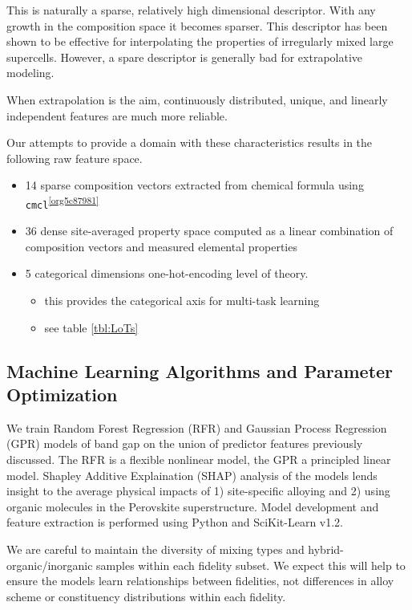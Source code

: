 This is naturally a sparse, relatively high dimensional descriptor.
With any growth in the composition space it becomes sparser.
This descriptor has been shown to be effective for interpolating the properties of irregularly mixed large supercells.
\autocite{mannodi-kanakkithodi-2022-data-driven}
However, a spare descriptor is generally bad for extrapolative modeling.
\autocite{ghiringhelli-2015-big-data} 

When extrapolation is the aim, continuously distributed, unique, and linearly independent features are much more reliable.
\autocite{lux-2020-inter-spars} 

Our attempts to provide a domain with these characteristics results in the following raw feature space.

\begin{itemize}
\item 14 sparse composition vectors extracted from chemical formula using \texttt{cmcl}\textsuperscript{\ref{org5c87981}}
\item 36 dense site-averaged property space computed as a linear combination of composition vectors and measured elemental properties \autocite{mentel-2014}
\item 5 categorical dimensions one-hot-encoding level of theory.
\begin{itemize}
\item this provides the categorical axis for multi-task learning
\item see table \ref{tbl:LoTs}
\end{itemize}
\end{itemize}

\subsection{Machine Learning Algorithms and Parameter Optimization}
\label{sec:orgcad1d7a}
We train Random Forest Regression (RFR) and Gaussian Process Regression (GPR) models of band gap on the union of predictor features previously discussed.
The RFR is a flexible nonlinear model, the GPR a principled linear model.
Shapley Additive Explaination (SHAP) analysis of the models lends insight to the average physical impacts of 1) site-specific alloying and 2) using organic molecules in the Perovskite superstructure.
 Model development and feature extraction is performed using Python and SciKit-Learn v1.2.
\autocite{pedregosa-2011-scikit-learn} 

We are careful to maintain the diversity of mixing types and hybrid-organic/inorganic samples within each fidelity subset.
We expect this will help to ensure the models learn relationships between fidelities, not differences in alloy scheme or constituency distributions within each fidelity.

